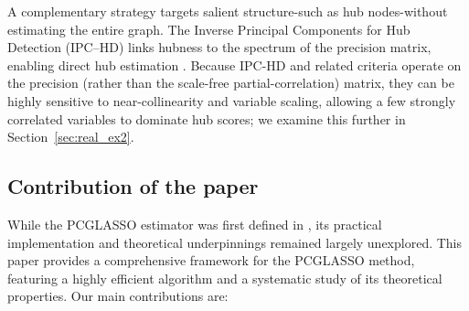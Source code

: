 \documentclass[12pt]{amsart}
\numberwithin{equation}{section}
\numberwithin{equation}{section}
\theoremstyle{plain}
\theoremstyle{definition}
\begin{document}

A complementary strategy targets salient structure-such as hub nodes-without estimating the entire graph. The Inverse Principal Components for Hub Detection (IPC–HD) links hubness to the spectrum of the precision matrix, enabling direct hub estimation \cite{HUB25}. Because IPC-HD and related criteria operate on the precision (rather than the scale-free partial-correlation) matrix, they can be highly sensitive to near-collinearity and variable scaling, allowing a few strongly correlated variables to dominate hub scores; we examine this further in Section~\ref{sec:real_ex2}.

\subsection{Contribution of the paper}

While the PCGLASSO estimator was first defined in \cite{Carter}, its practical implementation and theoretical underpinnings remained largely unexplored. This paper provides a comprehensive framework for the PCGLASSO method, featuring a highly efficient algorithm and a systematic study of its theoretical properties. Our main contributions are:
\end{document}

